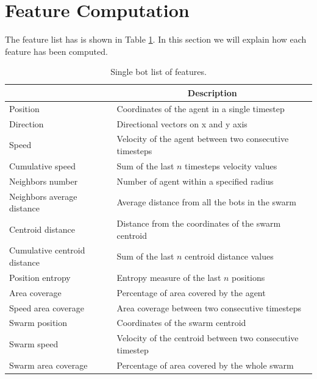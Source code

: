 \documentclass[../../Thesis.tex]{subfiles}
\begin{document}
 	\section{Feature Computation}
 	\label{sec:feature_computation} %
		The feature list has is shown in Table \ref{tab:feature_list}. In this section we will explain how each feature has been computed.
	 		\bgroup
	 		\def\arraystretch{1.5}
	 		\begin{table}
		 		\begin{tabular}{|l|l|}
		 			\hline
		 			\rowcolor{bluepoli!40}
		 			\hline
		 			\multicolumn{1}{|c|}{\textbf{Feature}} & \multicolumn{1}{|c|}{\textbf{Description}} \T\B \\
		 			\hline
		 			Position & Coordinates of the agent in a single timestep \\
		 			Direction & Directional vectors on x and y axis \\
		 			Speed & Velocity of the agent between two consecutive timesteps\\
		 			Cumulative speed & Sum of the last $n$ timesteps velocity values\\
		 			Neighbors number & Number of agent within a specified radius\\
		 			Neighbors average distance & Average distance from all the bots in the swarm\\
		 			Centroid distance & Distance from the coordinates of the swarm centroid\\
		 			Cumulative centroid distance & Sum of the last $n$ centroid distance values\\
		 			Position entropy & Entropy measure of the last $n$ positions\\
		 			Area coverage & Percentage of area covered by the agent\\
		 			Speed area coverage & Area coverage between two consecutive timesteps\\
		 			Swarm position & Coordinates of the swarm centroid\\
		 			Swarm speed & Velocity of the centroid between two consecutive timestep\\
		 			Swarm area coverage & Percentage of area covered by the whole swarm\\
		 			\hline
		 		\end{tabular}
		 		\caption{Single bot list of features.}
		 		\label{tab:feature_list}
	 		\end{table}
	 		\egroup
	 	
\end{document}
